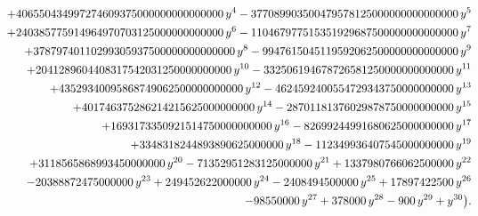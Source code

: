 \documentclass[a4paper,12pt]{article}
\begin{document}
\begin{eqnarray}
   &&\hspace{-11mm}\;\;+ 406550434997274609375000000000000000\,y^4 -
      377089903500479578125000000000000000\,y^5 \nonumber\\
   &&\hspace{-11mm}\;\;+ 240385775914964970703125000000000000\,y^6 -
      110467977515351929687500000000000000\,y^7 \nonumber\\
   &&\hspace{-11mm}\;\;+ 37879740110299305937500000000000000\,y^8 -
      9947615045119592062500000000000000\,y^9 \nonumber\\
   &&\hspace{-11mm}\;\;+ 2041289604408317542031250000000000\,y^{10} -
      332506194678726581250000000000000\,y^{11} \nonumber\\
   &&\hspace{-11mm}\;\;+ 43529340095868749062500000000000\,y^{12} -
      4624592400554729343750000000000\,y^{13} \nonumber\\
   &&\hspace{-11mm}\;\;+ 401746375286214215625000000000\,y^{14} -
      28701181376029878750000000000\,y^{15} \nonumber\\
   &&\hspace{-11mm}\;\;+ 1693173350921514750000000000\,y^{16} -
      82699244991680625000000000\,y^{17} \nonumber\\
   &&\hspace{-11mm}\;\;+ 3348318244893890625000000\,y^{18} -
      112349936407545000000000\,y^{19} \nonumber\\
   &&\hspace{-11mm}\;\;+ 3118565868993450000000\,y^{20} -
      71352951283125000000\,y^{21} + 1337980766062500000\,y^{22} \nonumber\\
   &&\hspace{-11mm}\;\;- 20388872475000000\,y^{23} + 249452622000000\,y^{24} -
      2408494500000\,y^{25} + 17897422500\,y^{26} \nonumber\\
   &&\hspace{-11mm}\;\;- 98550000\,y^{27} +
      378000\,y^{28} - 900\,y^{29} + y^{30} \bigr).
\end{eqnarray}

\end{document}
